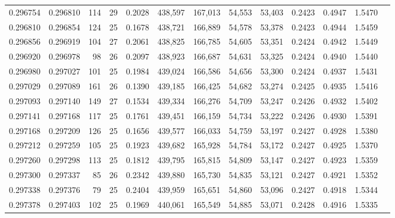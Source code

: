 \begin{tabular}{rrrrrrrrrrrrr}
0.296754 & 0.296810 &   114 &  29 &                                     0.2028 & 438,597 & 167,013 &  54,553 &  53,403 & 0.2423 & 0.4947 & 1.5470 \\
0.296810 & 0.296854 &   124 &  25 &                                     0.1678 & 438,721 & 166,889 &  54,578 &  53,378 & 0.2423 & 0.4944 & 1.5459 \\
0.296856 & 0.296919 &   104 &  27 &                                     0.2061 & 438,825 & 166,785 &  54,605 &  53,351 & 0.2424 & 0.4942 & 1.5449 \\
0.296920 & 0.296978 &    98 &  26 &                                     0.2097 & 438,923 & 166,687 &  54,631 &  53,325 & 0.2424 & 0.4940 & 1.5440 \\
0.296980 & 0.297027 &   101 &  25 &                                     0.1984 & 439,024 & 166,586 &  54,656 &  53,300 & 0.2424 & 0.4937 & 1.5431 \\
0.297029 & 0.297089 &   161 &  26 &                                     0.1390 & 439,185 & 166,425 &  54,682 &  53,274 & 0.2425 & 0.4935 & 1.5416 \\
0.297093 & 0.297140 &   149 &  27 &                                     0.1534 & 439,334 & 166,276 &  54,709 &  53,247 & 0.2426 & 0.4932 & 1.5402 \\
0.297141 & 0.297168 &   117 &  25 &                                     0.1761 & 439,451 & 166,159 &  54,734 &  53,222 & 0.2426 & 0.4930 & 1.5391 \\
0.297168 & 0.297209 &   126 &  25 &                                     0.1656 & 439,577 & 166,033 &  54,759 &  53,197 & 0.2427 & 0.4928 & 1.5380 \\
0.297212 & 0.297259 &   105 &  25 &                                     0.1923 & 439,682 & 165,928 &  54,784 &  53,172 & 0.2427 & 0.4925 & 1.5370 \\
0.297260 & 0.297298 &   113 &  25 &                                     0.1812 & 439,795 & 165,815 &  54,809 &  53,147 & 0.2427 & 0.4923 & 1.5359 \\
0.297300 & 0.297337 &    85 &  26 &                                     0.2342 & 439,880 & 165,730 &  54,835 &  53,121 & 0.2427 & 0.4921 & 1.5352 \\
0.297338 & 0.297376 &    79 &  25 &                                     0.2404 & 439,959 & 165,651 &  54,860 &  53,096 & 0.2427 & 0.4918 & 1.5344 \\
0.297378 & 0.297403 &   102 &  25 &                                     0.1969 & 440,061 & 165,549 &  54,885 &  53,071 & 0.2428 & 0.4916 & 1.5335 \\

\end{tabular}
